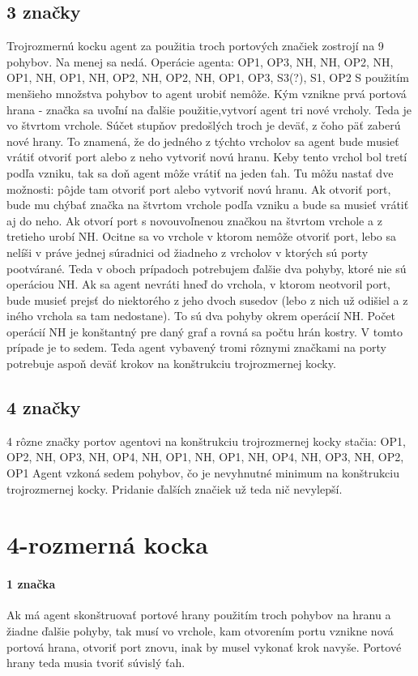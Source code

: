 \subsection{3 značky}
Trojrozmernú kocku agent za použitia troch portových značiek zostrojí na 9
pohybov. Na menej sa nedá.
Operácie agenta: OP1, OP3, NH, NH, OP2, NH, OP1, NH, OP1, NH, OP2, NH, OP2,
NH, OP1, OP3, S3(?), S1, OP2
S použitím menšieho množstva pohybov to agent urobiť nemôže. Kým vznikne
prvá portová hrana - značka sa uvoľní na ďalšie použitie,vytvorí agent tri
nové vrcholy. Teda je vo štvrtom vrchole. Súčet  stupňov predošlých troch je
deväť, z čoho päť zaberú nové hrany. To znamená, že do jedného z týchto
vrcholov sa agent bude musieť vrátiť otvoriť port alebo z neho vytvoriť novú
hranu. Keby tento vrchol bol tretí podľa vzniku, tak sa doň agent môže
vrátiť na jeden ťah. Tu môžu nastať dve možnosti: pôjde tam otvoriť port
alebo vytvoriť novú hranu. Ak otvoriť port, bude mu chýbať značka na štvrtom
vrchole podľa vzniku a bude sa musieť vrátiť aj do neho. Ak otvorí port s
novouvoľnenou značkou na štvrtom vrchole a z tretieho urobí NH. Ocitne sa vo
vrchole v ktorom nemôže otvoriť port, lebo sa nelíši v práve jednej
súradnici od žiadneho z vrcholov v ktorých sú porty pootvárané. Teda v oboch
prípadoch potrebujem ďalšie dva pohyby, ktoré nie sú operáciou NH. Ak sa
agent nevráti hneď do vrchola, v ktorom neotvoril port, bude musieť prejsť
do niektorého z jeho dvoch susedov (lebo z nich už odišiel a z iného vrchola
sa tam nedostane). To sú dva pohyby okrem operácií NH. Počet operácií NH je
konštantný pre daný  graf a rovná sa počtu hrán kostry. V tomto prípade je
to sedem. Teda agent vybavený tromi rôznymi značkami na porty potrebuje
aspoň deväť krokov na konštrukciu trojrozmernej kocky.

\subsection{4 značky}
4 rôzne značky portov agentovi na konštrukciu trojrozmernej kocky stačia:
OP1, OP2, NH, OP3, NH, OP4, NH, OP1, NH, OP1, NH, OP4, NH, OP3, NH, OP2, OP1
Agent vzkoná sedem pohybov, čo je nevyhnutné minimum na konštrukciu
trojrozmernej kocky. Pridanie ďalších značiek už teda nič nevylepší.

\section{4-rozmerná kocka}
\paragraph{1 značka}
Ak má agent skonštruovať portové hrany použitím troch pohybov na hranu a žiadne
ďalšie pohyby, tak musí vo vrchole, kam otvorením portu vznikne nová
portová hrana, otvoriť port znovu, inak by musel vykonať krok navyše.
Portové hrany teda musia tvoriť súvislý ťah. 

